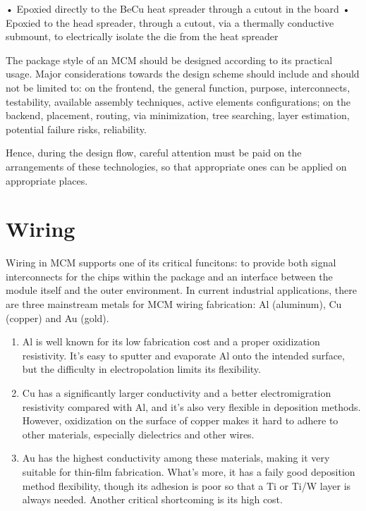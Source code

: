 \begin{spacing}{1.5}
• Epoxied directly to the BeCu heat spreader through a cutout in the board
• Epoxied to the head spreader, through a cutout, via a thermally conductive submount, to electrically isolate the die from the heat spreader

The package style of an MCM should be designed according to its practical usage. Major considerations towards the design scheme should include and should not be limited to: on the frontend, the general function, purpose, interconnects, testability, available assembly techniques, active elements configurations; on the backend, placement, routing, via minimization, tree searching, layer estimation, potential failure risks, reliability. 

Hence, during the design flow, careful attention must be paid on the arrangements of these technologies, so that appropriate ones can be applied on appropriate places. \cite{chen2006vlsi} 


\section{Wiring}

Wiring in MCM supports one of its critical funcitons: to provide both signal interconnects for the chips within the package and an interface between the module itself and the outer environment. In current industrial applications, there are three mainstream metals for MCM wiring fabrication: Al (aluminum), Cu (copper) and Au (gold). 

\begin{enumerate}
    \item Al is well known for its low fabrication cost and a proper oxidization resistivity. It's easy to sputter and evaporate Al onto the intended surface, but the difficulty in electropolation limits its flexibility. 
    \item Cu has a significantly larger conductivity and a better electromigration resistivity compared with Al, and it's also very flexible in deposition methods. However, oxidization on the surface of copper makes it hard to adhere to other materials, especially dielectrics and other wires. 
    \item Au has the highest conductivity among these materials, making it very suitable for thin-film fabrication. What's more, it has a faily good deposition method flexibility, though its adhesion is poor so that a Ti or Ti/W layer is always needed. Another critical shortcoming is its high cost. 
\end{enumerate} 


\end{spacing}
